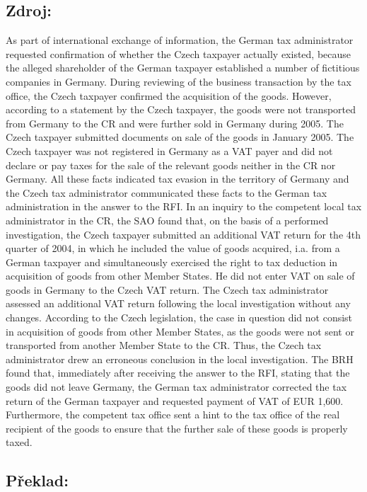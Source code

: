\documentclass[10pt]{article}
\begin{document}
\subsection*{Zdroj:}

As part of international exchange of information, the German tax administrator requested confirmation of whether the Czech taxpayer actually existed, because the alleged shareholder of the German taxpayer established a number of fictitious companies in Germany.
During reviewing of the business transaction by the tax office, the Czech taxpayer confirmed the acquisition of the goods.
However, according to a statement by the Czech taxpayer, the goods were not transported from Germany to the CR and were further sold in Germany during 2005.
The Czech taxpayer submitted documents on sale of the goods in January 2005.
The Czech taxpayer was not registered in Germany as a VAT payer and did not declare or pay taxes for the sale of the relevant goods neither in the CR nor Germany.
All these facts indicated tax evasion in the territory of Germany and the Czech tax administrator communicated these facts to the German tax administration in the answer to the RFI.
In an inquiry to the competent local tax administrator in the CR, the SAO found that, on the basis of a performed investigation, the Czech taxpayer submitted an additional VAT return for the 4th quarter of 2004, in which he included the value of goods acquired, i.a. from a German taxpayer and simultaneously exercised the right to tax deduction in acquisition of goods from other Member States.
He did not enter VAT on sale of goods in Germany to the Czech VAT return.
The Czech tax administrator assessed an additional VAT return following the local investigation without any changes.
According to the Czech legislation, the case in question did not consist in acquisition of goods from other Member States, as the goods were not sent or transported from another Member State to the CR.
Thus, the Czech tax administrator drew an erroneous conclusion in the local investigation.
The BRH found that, immediately after receiving the answer to the RFI, stating that the goods did not leave Germany, the German tax administrator corrected the tax return of the German taxpayer and requested payment of VAT of EUR 1,600.
Furthermore, the competent tax office sent a hint to the tax office of the real recipient of the goods to ensure that the further sale of these goods is properly taxed.


\pagebreak

\subsection*{Překlad:}
\end{document}
